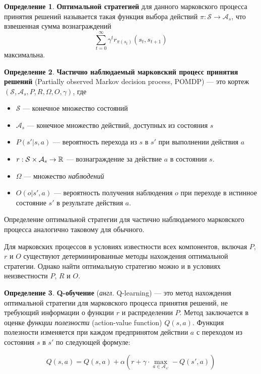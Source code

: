 \documentclass[specification,annotation,times]{itmo-student-thesis}
\theoremstyle{definition}
\newtheorem{definition-ru}{Определение}
\begin{document}
\begin{definition-ru}
  \textbf{Оптимальной стратегией} для данного марковского процесса принятия
  решений называется такая функция выбора действий $\pi : \mathcal{S} \rightarrow \mathcal{A}_s$,
  что взвешенная сумма вознаграждений
  \begin{equation}\label{eq:reward-sum}
    \sum\limits_{t=0}^{\infty} {\gamma^t r_{\pi(s_t)}(s_t, s_{t+1})}
  \end{equation}
  максимальна.
\end{definition-ru}

\begin{definition-ru}
  \textbf{Частично наблюдаемый марковский процесс принятия решений} (Partially
  observed Markov decision process, POMDP) --- это кортеж
  $(\mathcal{S}, \mathcal{A}_s, P, R, \Omega, O, \gamma)$, где
  \begin{itemize}
  \item $\mathcal{S}$ --- конечное множество состояний
  \item $\mathcal{A}_s$ --- конечное множество действий, доступных из состояния $s$
  \item $P(s' | s, a)$ --- вероятность перехода из $s$ в $s'$ при выполнении
    действия $a$
  \item $r : \mathcal{S} \times \mathcal{A}_s \rightarrow \Bbb{R}$ ---
    вознаграждение за действие $a$ в состоянии $s$.
  \item $\Omega$ --- множество \textit{наблюдений}
  \item $O(o | s', a)$ --- вероятность получения наблюдения $o$ при переходе в
    истинное состояние $s'$ в результате действия $a$. 
  \end{itemize}
\end{definition-ru}

Определение оптимальной стратегии для частично наблюдаемого марковского процесса
аналогично таковому для обычного.

Для марковских процессов в условиях известности всех компонентов, включая $P$,
$r$ и $O$ существуют детерминированные методы нахождения оптимальной стратегии.
Однако найти оптимальную стратегию можно и в условиях неизвестности $P$, $R$ и $O$.

\begin{definition-ru}
  \textbf{Q-обучение} (\textit{англ.} Q-learning) \cite{q-learning-orig} --- это метод нахождения
  оптимальной стратегии для марковского процесса принятия решений, не требующий
  информации о функции $r$ и распределении $P$. Метод заключается в оценке
  \textit{функции полезности} (action-value function)
  $Q(s,a)$. Функция полезности изменяется при каждом предпринятом действии $a$ с
  переходом из состояния $s$ в $s'$ по следующей формуле:

  \begin{equation}\label{eq:q-learning}
    Q(s, a) = Q(s, a) + \alpha \left( r +
    \gamma \cdot \max\limits_{a \in \mathcal{A}_{s'}} - Q(s', a) \right)
  \end{equation}
\end{definition-ru}
\end{document}
